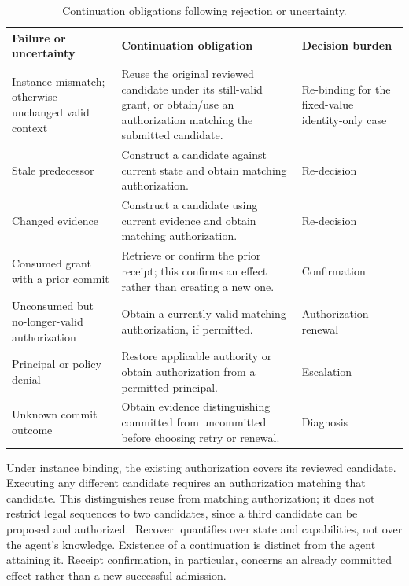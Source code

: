 \begin{table}[htbp]
\centering\small
\caption{Continuation obligations following rejection or uncertainty.}
\label{tab:appendix-continuation}
\begin{tabularx}{\textwidth}{@{}>{\raggedright\arraybackslash}p{}>{\raggedright\arraybackslash}X>{\raggedright\arraybackslash}p{}@{}}
\toprule
Failure or uncertainty & Continuation obligation & Decision burden\\
\midrule
Instance mismatch; otherwise unchanged valid context &
Reuse the original reviewed candidate under its still-valid grant, or obtain/use an authorization matching the submitted candidate. &
Re-binding for the fixed-value identity-only case\\
Stale predecessor &
Construct a candidate against current state and obtain matching authorization. &
Re-decision\\
Changed evidence &
Construct a candidate using current evidence and obtain matching authorization. &
Re-decision\\
Consumed grant with a prior commit &
Retrieve or confirm the prior receipt; this confirms an effect rather than creating a new one. &
Confirmation\\
Unconsumed but no-longer-valid authorization &
Obtain a currently valid matching authorization, if permitted. &
Authorization renewal\\
Principal or policy denial &
Restore applicable authority or obtain authorization from a permitted principal. &
Escalation\\
Unknown commit outcome &
Obtain evidence distinguishing committed from uncommitted before choosing retry or renewal. &
Diagnosis\\
\bottomrule
\end{tabularx}
\end{table}

Under instance binding, the existing authorization covers its reviewed candidate. Executing any different candidate requires an authorization matching that candidate. This distinguishes reuse from matching authorization; it does not restrict legal sequences to two candidates, since a third candidate can be proposed and authorized. $\operatorname{Recover}$ quantifies over state and capabilities, not over the agent's knowledge. Existence of a continuation is distinct from the agent attaining it. Receipt confirmation, in particular, concerns an already committed effect rather than a new successful admission.

